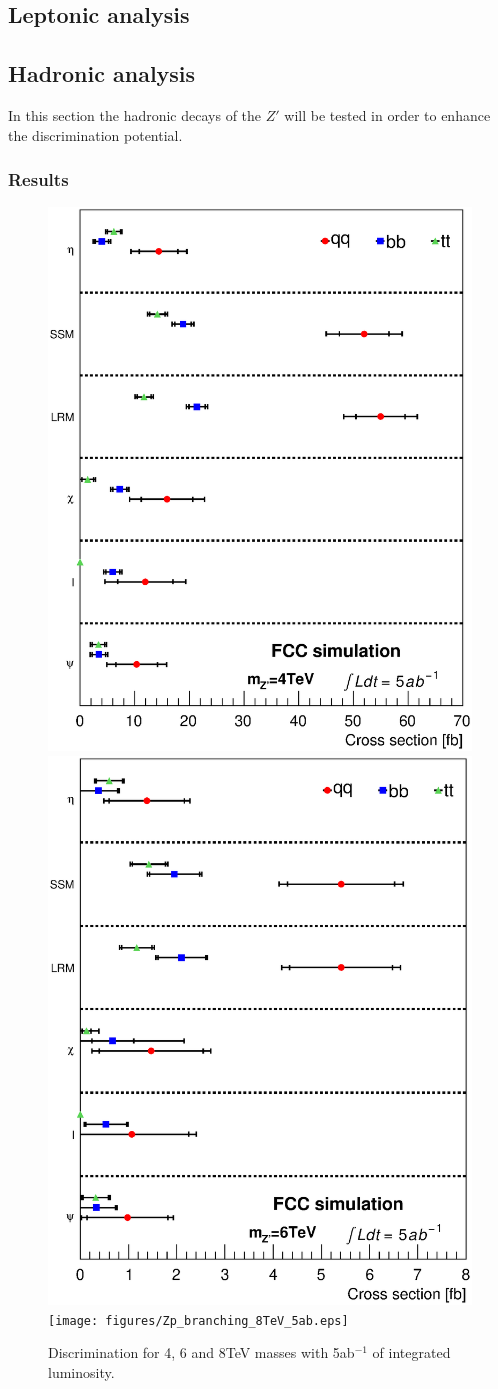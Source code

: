 \documentclass[14pt]{article}
\begin{document}
\subsection{Leptonic analysis}
\label{sec:lepana}

\subsection{Hadronic analysis}
In this section the hadronic decays of the $Z'$ will be tested in order to enhance the discrimination potential.
\subsubsection{Results}

\begin{figure}[h]
  \centering
    \includegraphics[width=0.45\columnwidth]{figures/Zp_branching_4TeV_5ab.eps}
    \includegraphics[width=0.45\columnwidth]{figures/Zp_branching_6TeV_5ab.eps}
    \texttt{[image: figures/Zp\_branching\_8TeV\_5ab.eps]}
  \caption{Discrimination for 4, 6 and 8TeV masses with 5ab$^{-1}$ of integrated luminosity.}
  \label{figure:hadana:discri5ab}
\end{figure}
\end{document}
